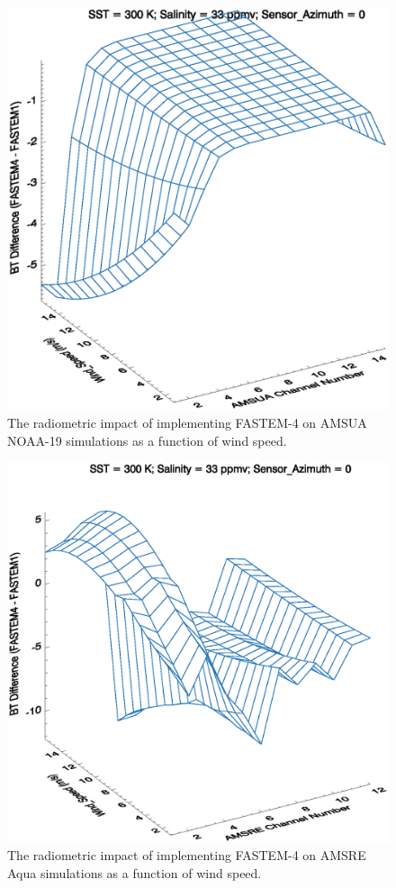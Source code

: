 \begin{figure}[htp]
  \centering
  \includegraphics[scale=0.75]{graphics/AMSUA_Wind_Speed_BT.eps}
  \caption{The radiometric impact of implementing FASTEM-4 on AMSUA NOAA-19 simulations as a function of wind speed.}
  \label{fig:AMSUA_Wind_Speed_Impact}
\end{figure}

\newpage

\begin{figure}[htp]
  \centering
  \includegraphics[scale=0.75]{graphics/AMSRE_Wind_Speed_BT.eps}
  \caption{The radiometric impact of implementing FASTEM-4 on AMSRE Aqua simulations as a function of wind speed.}
  \label{fig:AMSRE_Wind_Speed_Impact}
\end{figure}

